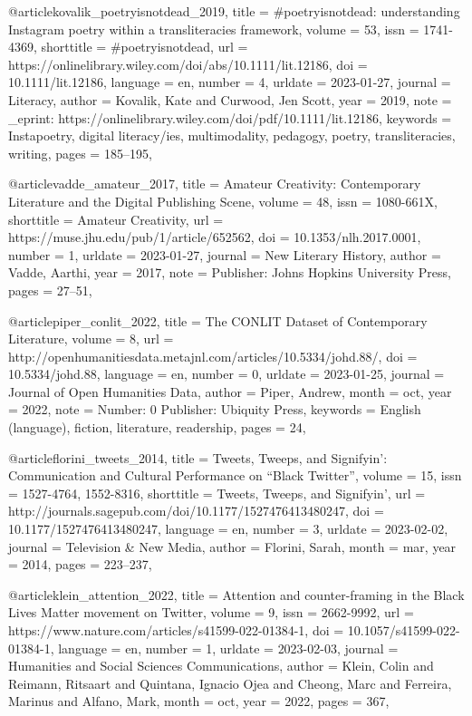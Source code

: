 
@article{kovalik_poetryisnotdead_2019,
	title = {\#poetryisnotdead: understanding {Instagram} poetry within a transliteracies framework},
	volume = {53},
	issn = {1741-4369},
	shorttitle = {\#poetryisnotdead},
	url = {https://onlinelibrary.wiley.com/doi/abs/10.1111/lit.12186},
	doi = {10.1111/lit.12186},
	language = {en},
	number = {4},
	urldate = {2023-01-27},
	journal = {Literacy},
	author = {Kovalik, Kate and Curwood, Jen Scott},
	year = {2019},
	note = {\_eprint: https://onlinelibrary.wiley.com/doi/pdf/10.1111/lit.12186},
	keywords = {Instapoetry, digital literacy/ies, multimodality, pedagogy, poetry, transliteracies, writing},
	pages = {185--195},
}

@article{vadde_amateur_2017,
	title = {Amateur {Creativity}: {Contemporary} {Literature} and the {Digital} {Publishing} {Scene}},
	volume = {48},
	issn = {1080-661X},
	shorttitle = {Amateur {Creativity}},
	url = {https://muse.jhu.edu/pub/1/article/652562},
	doi = {10.1353/nlh.2017.0001},
	number = {1},
	urldate = {2023-01-27},
	journal = {New Literary History},
	author = {Vadde, Aarthi},
	year = {2017},
	note = {Publisher: Johns Hopkins University Press},
	pages = {27--51},
}

@article{piper_conlit_2022,
	title = {The {CONLIT} {Dataset} of {Contemporary} {Literature}},
	volume = {8},
	url = {http://openhumanitiesdata.metajnl.com/articles/10.5334/johd.88/},
	doi = {10.5334/johd.88},
	language = {en},
	number = {0},
	urldate = {2023-01-25},
	journal = {Journal of Open Humanities Data},
	author = {Piper, Andrew},
	month = oct,
	year = {2022},
	note = {Number: 0
Publisher: Ubiquity Press},
	keywords = {English (language), fiction, literature, readership},
	pages = {24},
}


@article{florini_tweets_2014,
	title = {Tweets, {Tweeps}, and {Signifyin}’: {Communication} and {Cultural} {Performance} on “{Black} {Twitter}”},
	volume = {15},
	issn = {1527-4764, 1552-8316},
	shorttitle = {Tweets, {Tweeps}, and {Signifyin}’},
	url = {http://journals.sagepub.com/doi/10.1177/1527476413480247},
	doi = {10.1177/1527476413480247},
	language = {en},
	number = {3},
	urldate = {2023-02-02},
	journal = {Television \& New Media},
	author = {Florini, Sarah},
	month = mar,
	year = {2014},
	pages = {223--237},
}


@article{klein_attention_2022,
	title = {Attention and counter-framing in the {Black} {Lives} {Matter} movement on {Twitter}},
	volume = {9},
	issn = {2662-9992},
	url = {https://www.nature.com/articles/s41599-022-01384-1},
	doi = {10.1057/s41599-022-01384-1},
	language = {en},
	number = {1},
	urldate = {2023-02-03},
	journal = {Humanities and Social Sciences Communications},
	author = {Klein, Colin and Reimann, Ritsaart and Quintana, Ignacio Ojea and Cheong, Marc and Ferreira, Marinus and Alfano, Mark},
	month = oct,
	year = {2022},
	pages = {367},
}

